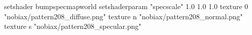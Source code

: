 setshader bumpspecmapworld
setshaderparam "specscale" 1.0 1.0 1.0
   texture 0 "nobiax/pattern208_diffuse.png"
   texture n "nobiax/pattern208_normal.png"
   texture s "nobiax/pattern208_specular.png"